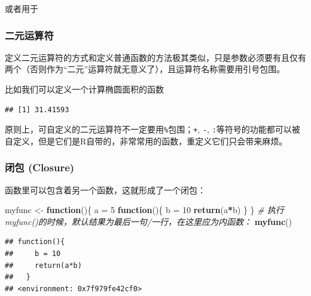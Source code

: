\documentclass[]{book}
\newenvironment{Shaded}{\begin{snugshade}}{\end{snugshade}}
\newcommand{\CommentTok}[1]{\textcolor[rgb]{0.56,0.35,0.01}{\textit{#1}}}
\newcommand{\ControlFlowTok}[1]{\textcolor[rgb]{0.13,0.29,0.53}{\textbf{#1}}}
\newcommand{\DecValTok}[1]{\textcolor[rgb]{0.00,0.00,0.81}{#1}}
\newcommand{\KeywordTok}[1]{\textcolor[rgb]{0.13,0.29,0.53}{\textbf{#1}}}
\newcommand{\NormalTok}[1]{#1}
\newcommand{\OperatorTok}[1]{\textcolor[rgb]{0.81,0.36,0.00}{\textbf{#1}}}
\newcommand{\StringTok}[1]{\textcolor[rgb]{0.31,0.60,0.02}{#1}}
\begin{document}
或者用于

\hypertarget{binary-operaters}{%
\subsubsection{二元运算符}\label{binary-operaters}}

定义二元运算符的方式和定义普通函数的方法极其类似，只是参数必须要有且仅有两个（否则作为``二元''运算符就无意义了），且运算符名称需要用引号包围。

比如我们可以定义一个计算椭圆面积的函数

\begin{Shaded}
\end{Shaded}

\begin{verbatim}
## [1] 31.41593
\end{verbatim}

原则上，可自定义的二元运算符不一定要用\texttt{\%}包围；\texttt{+}, \texttt{-}, \texttt{:}等符号的功能都可以被自定义，但是它们是R自带的，非常常用的函数，重定义它们只会带来麻烦。

\hypertarget{closure}{%
\subsubsection{闭包 (Closure)}\label{closure}}

函数里可以包含着另一个函数，这就形成了一个闭包：

\begin{Shaded}
\begin{Highlighting}[]
\NormalTok{myfunc <-}\StringTok{ }\ControlFlowTok{function}\NormalTok{()\{}
\NormalTok{  a =}\StringTok{ }\DecValTok{5}
  \ControlFlowTok{function}\NormalTok{()\{}
\NormalTok{    b =}\StringTok{ }\DecValTok{10}
    \KeywordTok{return}\NormalTok{(a}\OperatorTok{*}\NormalTok{b)}
\NormalTok{  \}}
\NormalTok{\}}
\CommentTok{# 执行myfunc()的时候，默认结果为最后一句/一行，在这里应为内函数：}
\KeywordTok{myfunc}\NormalTok{()}
\end{Highlighting}
\end{Shaded}

\begin{verbatim}
## function(){
##     b = 10
##     return(a*b)
##   }
## <environment: 0x7f979fe42cf0>
\end{verbatim}
\end{document}
